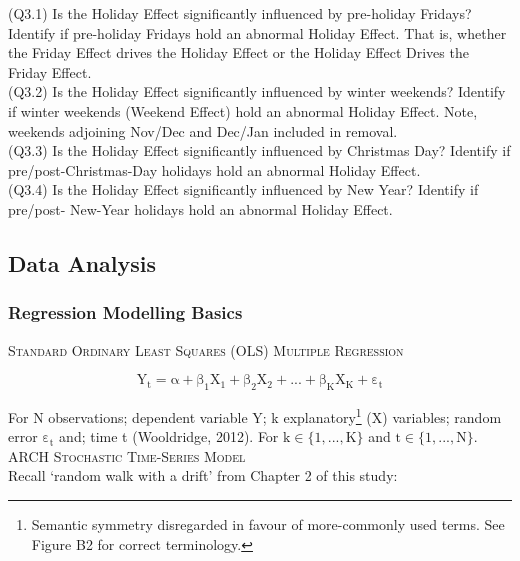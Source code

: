 \documentclass[11pt, english]{article}
\begin{document}
			(Q3.1) Is the Holiday Effect significantly influenced by pre-holiday Fridays? Identify if pre-holiday Fridays hold an abnormal Holiday Effect. That is, whether the Friday Effect drives the Holiday Effect or the Holiday Effect Drives the Friday Effect.\\

			(Q3.2) Is the Holiday Effect significantly influenced by winter weekends? Identify if winter weekends (Weekend Effect) hold an abnormal Holiday Effect. Note, weekends adjoining Nov/Dec and Dec/Jan included in removal.\\

			(Q3.3) Is the Holiday Effect significantly influenced by Christmas Day? Identify if pre/post-Christmas-Day holidays hold an abnormal Holiday Effect.\\

			(Q3.4) Is the Holiday Effect significantly influenced by New Year? Identify if pre/post- New-Year holidays hold an abnormal Holiday Effect.

	\newpage

	\subsection{Data Analysis}

		\subsubsection{Regression Modelling Basics}
	
		\textsc{Standard Ordinary Least Squares (OLS) Multiple Regression}

		$$\mathrm{Y_t=\alpha+\beta_1X_1+\beta_2X_2+...+\beta_KX_K+\varepsilon_t}$$

		For N observations; dependent variable Y; k explanatory\footnote{Semantic symmetry disregarded in favour of more-commonly used terms. See Figure B2 for correct terminology.} (X) variables; random error $\mathrm{\varepsilon_t}$ and; time t (Wooldridge, 2012). For $\mathrm{k\in\{1,...,K\}}$ and $\mathrm{t\in\{1,...,N\}}$.\\

		\textsc{ARCH Stochastic Time-Series Model}\\

		Recall `random walk with a drift' from Chapter 2 of this study:
\end{document}

